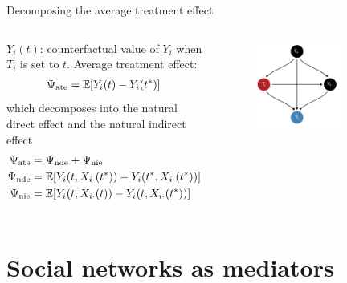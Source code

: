 \documentclass[aspectratio=169]{beamer}
\theoremstyle{remark}
\begin{document}
\begin{frame}{Decomposing the average treatment effect}

    \begin{columns}


        $Y_i(t)$: counterfactual value of $Y_i$ when $T_i$ is set to $t$. Average treatment effect:
        \begin{align*}
            \ate = \E{Y_i(t) - Y_i(t^*)}
        \end{align*}
        which decomposes into the natural direct effect and the natural indirect effect
        \begin{align*}
            \ate & = \nde + \nie                                                    \\
            \nde & = \E{Y_i (t, \X_{i \cdot}(t^*)) - Y_i (t^*, \X_{i \cdot} (t^*))} \\
            \nie & = \E{Y_i (t, \X_{i \cdot}(t)) - Y_i (t, \X_{i \cdot} (t^*))}
        \end{align*}


        \begin{figure}[ht]
            \centering
            \includegraphics[width=0.7\textwidth]{figures/dags/mediating.png}
        \end{figure}
    \end{columns}


\end{frame}

\section{Social networks as mediators}
\end{document}

